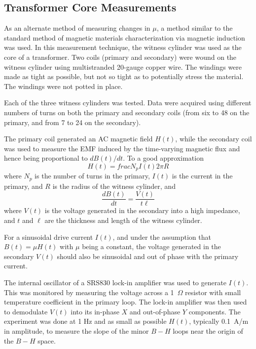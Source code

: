 
\subsection{Transformer Core Measurements}

As an alternate method of measuring changes in $\mu$, a method similar
to the standard method of magnetic materials characterization via
magnetic induction was used.  In this measurement technique, the
witness cylinder was used as the core of a transformer.  Two coils
(primary and secondary) were wound on the witness cylinder using
multistranded 20-gauge copper wire.  The windings were made as tight
as possible, but not so tight as to potentially stress the material.
The windings were not potted in place.

Each of the three witness cylinders was tested.  Data were acquired
using different numbers of turns on both the primary and secondary
coils (from six to 48 on the primary, and from 7 to 24 on the
secondary).



The primary coil generated an AC magnetic field $H(t)$, while the
secondary coil was used to measure the EMF induced by the time-varying
magnetic flux and hence being proportional to $dB(t)/dt$.  To a good
approximation
\begin{equation}
H(t)=frac{N_pI(t)}{2\pi R}
\end{equation}
where $N_p$ is the number of turns in the primary, $I(t)$ is the
current in the primary, and $R$ is the radius of the witness cylinder,
and
\begin{equation}
\frac{dB(t)}{dt}=\frac{V(t)}{t\ell}
\end{equation}
where $V(t)$ is the voltage generated in the secondary into a high
impedance, and $t$ and $\ell$ are the thickness and length of the
witness cylinder.

For a sinusoidal drive current $I(t)$, and under the assumption that
$B(t)=\mu H(t)$ with $\mu$ being a constant, the voltage generated in
the secondary $V(t)$ should also be sinusoidal and out of phase with
the primary current.

The internal oscillator of a SRS830 lock-in amplifier was used to
generate $I(t)$.  This was monitored by measuring the voltage across a
1~$\Omega$ resistor with small temperature coefficient in the primary
loop.  The lock-in amplifier was then used to demodulate $V(t)$ into
its in-phase $X$ and out-of-phase $Y$ components.  The experiment was
done at 1 Hz and as small as possible $H(t)$, typically 0.1~A/m in
amplitude, to measure the slope of the minor $B-H$ loops near the
origin of the $B-H$ space.

